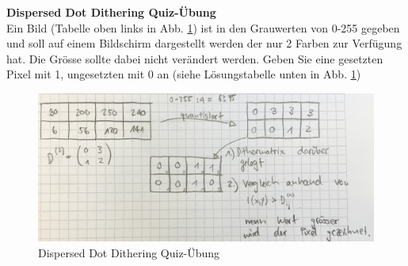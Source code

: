\noindent
\textbf{Dispersed Dot Dithering Quiz-Übung}\\
Ein Bild (Tabelle oben links in Abb. \ref{fig:dispdot_bsp}) ist in den Grauwerten von 0-255 gegeben und soll auf einem Bildschirm dargestellt werden der nur 2 Farben zur Verfügung hat. Die Grösse sollte dabei nicht verändert werden. 
Geben Sie eine gesetzten Pixel mit 1, ungesetzten mit 0 an (siehe Lösungstabelle unten in Abb. \ref{fig:dispdot_bsp})
\begin{figure}[!ht]
\centering
\includegraphics[width=0.7\linewidth]{fig/disperseddot_bsp}
\caption{Dispersed Dot Dithering Quiz-Übung}
\label{fig:dispdot_bsp}
\end{figure}


